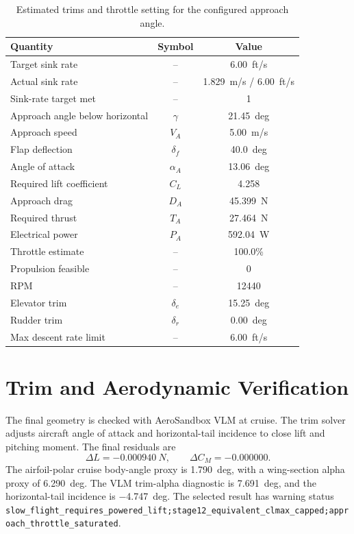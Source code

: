\documentclass[11pt]{article}
\begin{document}
\begin{table}[H]
\centering
\begin{tabular}{lcc}
\toprule
Quantity & Symbol & Value \\
\midrule
Target sink rate & -- & \SI{6.00}{ft/s} \\
Actual sink rate & -- & \SI{1.829}{m/s} / \SI{6.00}{ft/s} \\
Sink-rate target met & -- & 1 \\
Approach angle below horizontal & \(\gamma\) & \SI{21.45}{deg} \\
Approach speed & \(V_A\) & \SI{5.00}{m/s} \\
Flap deflection & \(\delta_f\) & \SI{40.0}{deg} \\
Angle of attack & \(\alpha_A\) & \SI{13.06}{deg} \\
Required lift coefficient & \(C_L\) & 4.258 \\
Approach drag & \(D_A\) & \SI{45.399}{N} \\
Required thrust & \(T_A\) & \SI{27.464}{N} \\
Electrical power & \(P_A\) & \SI{592.04}{W} \\
Throttle estimate & -- & 100.0\% \\
Propulsion feasible & -- & 0 \\
RPM & -- & \num{12440} \\
Elevator trim & \(\delta_e\) & \SI{15.25}{deg} \\
Rudder trim & \(\delta_r\) & \SI{0.00}{deg} \\
Max descent rate limit & -- & \SI{6.00}{ft/s} \\
\bottomrule
\end{tabular}
\caption{Estimated trims and throttle setting for the configured approach angle.}
\label{tab:stage3-approach}
\end{table}

\section{Trim and Aerodynamic Verification}
The final geometry is checked with AeroSandbox VLM at cruise. The trim solver adjusts aircraft angle of attack and horizontal-tail incidence to close lift and pitching moment. The final residuals are
\begin{equation}
\Delta L = \SI{-0.000940}{N}, \qquad \Delta C_M = -0.000000.
\end{equation}
The airfoil-polar cruise body-angle proxy is \SI{1.790}{deg}, with a wing-section alpha proxy of \SI{6.290}{deg}. The VLM trim-alpha diagnostic is \SI{7.691}{deg}, and the horizontal-tail incidence is \SI{-4.747}{deg}. The selected result has warning status \texttt{slow\_flight\_requires\_powered\_lift;stage12\_equivalent\_clmax\_capped;approach\_throttle\_saturated}.
\end{document}
